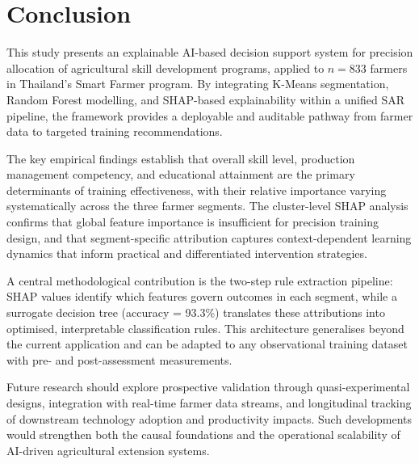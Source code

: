 \documentclass[3p,twocolumn,authoryear]{elsarticle}
\begin{document}
\section{Conclusion}

This study presents an explainable AI-based decision
support system for precision allocation of agricultural
skill development programs, applied to $n = 833$ farmers
in Thailand's Smart Farmer program.
By integrating K-Means segmentation, Random Forest
modelling, and SHAP-based explainability within a unified
SAR pipeline, the framework provides a deployable and
auditable pathway from farmer data to targeted training
recommendations.

The key empirical findings establish that overall skill
level, production management competency, and educational
attainment are the primary determinants of training
effectiveness, with their relative importance varying
systematically across the three farmer segments.
The cluster-level SHAP analysis confirms that global
feature importance is insufficient for precision training
design, and that segment-specific attribution captures
context-dependent learning dynamics that inform practical
and differentiated intervention strategies.

A central methodological contribution is the two-step
rule extraction pipeline: SHAP values identify which
features govern outcomes in each segment, while a
surrogate decision tree (accuracy = 93.3\%) translates
these attributions into optimised, interpretable
classification rules.
This architecture generalises beyond the current
application and can be adapted to any observational
training dataset with pre- and post-assessment measurements.

Future research should explore prospective validation
through quasi-experimental designs, integration with
real-time farmer data streams, and longitudinal tracking
of downstream technology adoption and productivity impacts.
Such developments would strengthen both the causal
foundations and the operational scalability of
AI-driven agricultural extension systems.

\end{document}
